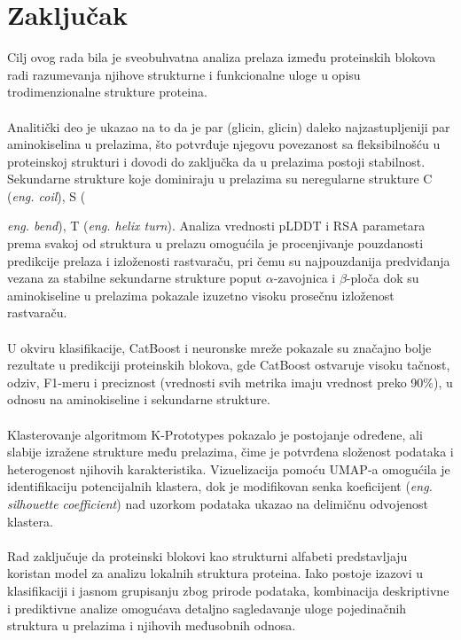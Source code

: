 \documentclass[a4paper,12pt]{article}
\begin{document}
\section{Zaključak}
Cilj ovog rada bila je sveobuhvatna analiza prelaza između proteinskih blokova radi razumevanja njihove strukturne i funkcionalne uloge u opisu trodimenzionalne strukture proteina.\\
\\
Analitički deo je ukazao na to da je par (glicin, glicin) daleko najzastupljeniji par aminokiselina u prelazima, što potvrđuje njegovu povezanost sa fleksibilnošću u proteinskoj strukturi i dovodi do zaključka da u prelazima postoji stabilnost. Sekundarne strukture koje dominiraju u prelazima su neregularne strukture C (\textit{eng. coil}), S ({\textit{eng. bend}), T ({\textit{eng. helix turn}}). Analiza vrednosti pLDDT i RSA parametara prema svakoj od struktura u prelazu omogućila je procenjivanje pouzdanosti predikcije prelaza i izloženosti rastvaraču, pri čemu su najpouzdanija predviđanja vezana za stabilne sekundarne strukture poput $\alpha$-zavojnica i $\beta$-ploča dok su aminokiseline u prelazima pokazale izuzetno visoku prosečnu izloženost rastvaraču.\\
\\
U okviru klasifikacije, CatBoost i neuronske mreže pokazale su značajno bolje rezultate u predikciji proteinskih blokova, gde CatBoost ostvaruje visoku tačnost, odziv, F1-meru i preciznost (vrednosti svih metrika imaju vrednost preko 90\%), u odnosu na aminokiseline i sekundarne strukture.\\
\\
Klasterovanje algoritmom K-Prototypes pokazalo je postojanje određene, ali slabije izražene strukture među prelazima, čime je potvrđena složenost podataka i heterogenost njihovih karakteristika. Vizuelizacija pomoću UMAP-a omogućila je identifikaciju potencijalnih klastera, dok je modifikovan senka koeficijent (\textit{eng. silhouette coefficient}) nad uzorkom podataka ukazao na delimičnu odvojenost klastera.\\
\\
Rad zaključuje da proteinski blokovi kao strukturni alfabeti predstavljaju koristan model za analizu lokalnih struktura proteina. Iako postoje izazovi u klasifikaciji i jasnom grupisanju zbog prirode podataka, kombinacija deskriptivne i prediktivne analize omogućava detaljno sagledavanje uloge pojedinačnih struktura u prelazima i njihovih međusobnih odnosa.

}
\end{document}
